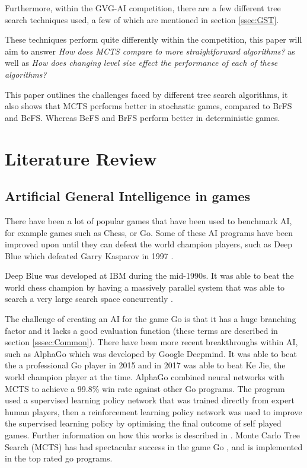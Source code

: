 \documentclass[journal]{IEEEtran}
\begin{document}
	Furthermore, within the GVG-AI competition, there are a few different tree search techniques used, a few of which are mentioned in section \ref{ssec:GST}. 
	
	These techniques perform quite differently within the competition, this paper will aim to answer \textit{How does MCTS compare to more straightforward algorithms?} as well as \textit{How does changing level size effect the performance of each of these algorithms?}

	This paper outlines the challenges faced by different tree search algorithms, it also shows that MCTS performs better in stochastic games, compared to BrFS and BeFS. Whereas BeFS and BrFS perform better in deterministic games.
	

\section{Literature Review}
	\subsection{Artificial General Intelligence in games}
		
		There have been a lot of popular games that have been used to benchmark AI, for example games such as Chess, or Go. Some of these AI programs have been improved upon until they can defeat the world champion players, such as Deep Blue which defeated Garry Kasparov in 1997 \cite{DeepBlue, shannon1988programming, DeepBlueOverview}. 

		Deep Blue was developed at IBM during the mid-1990s. It was able to beat the world chess champion by having a massively parallel system that was able to search a very large search space concurrently \cite{DeepBlue}.

		The challenge of creating an AI for the game Go is that it has a huge branching factor and it lacks a good evaluation function (these terms are described in section \ref{sssec:Common}). 
		There have been more recent breakthroughs within AI, such as AlphaGo \cite{silver2016mastering} which was developed by Google Deepmind. It was able to beat the a professional Go player in 2015 and in 2017 was able to beat Ke Jie, the world champion player at the time\cite{silver2016mastering}.
		AlphaGo combined neural networks with MCTS to achieve a 99.8\% win rate against other Go programs. The program used a supervised learning policy network that was trained directly from expert human players, then a reinforcement learning policy network was used to improve the supervised learning policy by optimising the final outcome of self played games. Further information on how this works is described in \cite{silver2016mastering}.
		Monte Carlo Tree Search (MCTS) has had spectacular success in the game Go \cite{browne2012survey}, and is implemented in the top rated go programs.
\end{document}
